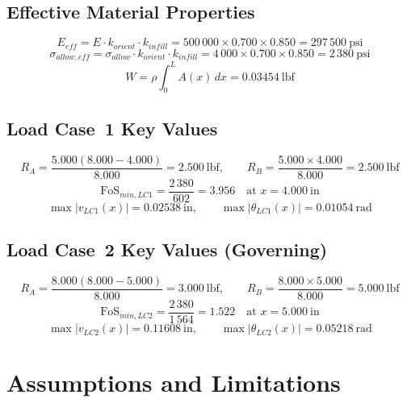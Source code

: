 \documentclass[11pt,letterpaper]{article}
\begin{document}
\subsection{Effective Material Properties}

\[
  E_{eff} = E \cdot k_{orient} \cdot k_{infill}
  = 500\,000 \times 0.700 \times 0.850 = 297\,500\ \mathrm{psi}
\]
\[
  \sigma_{allow,eff} = \sigma_{allow} \cdot k_{orient} \cdot k_{infill}
  = 4\,000 \times 0.700 \times 0.850 = 2\,380\ \mathrm{psi}
\]
\[
  W = \rho \int_0^L A(x)\,dx = 0.03454\ \mathrm{lbf}
\]

\subsection{Load Case~1 Key Values}

\[
  R_A = \frac{5.000(8.000 - 4.000)}{8.000} = 2.500\ \mathrm{lbf},
  \qquad
  R_B = \frac{5.000 \times 4.000}{8.000} = 2.500\ \mathrm{lbf}
\]
\[
  \mathrm{FoS}_{min,LC1}
  = \frac{2\,380}{602} = 3.956
  \quad \text{at } x = 4.000\ \mathrm{in}
\]
\[
  \max|v_{LC1}(x)| = 0.02538\ \mathrm{in},
  \qquad
  \max|\theta_{LC1}(x)| = 0.01054\ \mathrm{rad}
\]

\subsection{Load Case~2 Key Values (Governing)}

\[
  R_A = \frac{8.000(8.000 - 5.000)}{8.000} = 3.000\ \mathrm{lbf},
  \qquad
  R_B = \frac{8.000 \times 5.000}{8.000} = 5.000\ \mathrm{lbf}
\]
\[
  \mathrm{FoS}_{min,LC2}
  = \frac{2\,380}{1\,564} = 1.522
  \quad \text{at } x = 5.000\ \mathrm{in}
\]
\[
  \max|v_{LC2}(x)| = 0.11608\ \mathrm{in},
  \qquad
  \max|\theta_{LC2}(x)| = 0.05218\ \mathrm{rad}
\]


\section{Assumptions and Limitations}
\label{sec:assumptions}
\end{document}
